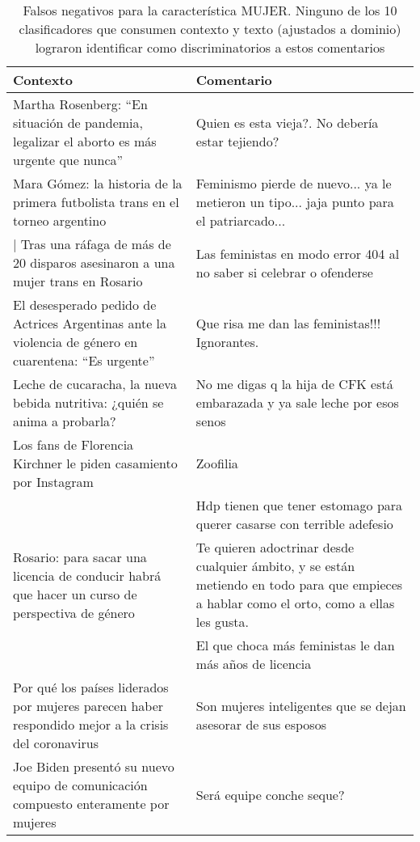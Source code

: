 \begin{table}[t]
    \centering
    \small
    \begin{tabularx}{\textwidth}{X X}
        Contexto & Comentario \\
        \hline
        Martha Rosenberg: ``En situación de pandemia, legalizar el aborto es más urgente que nunca'' & Quien es esta vieja?. No debería estar tejiendo? \\
        \hline
        Mara Gómez: la historia de la primera futbolista trans en el torneo argentino  &  Feminismo pierde de nuevo... ya le metieron un tipo... jaja punto para el patriarcado...	 \\
        \hline|
        Tras una ráfaga de más de 20 disparos asesinaron a una mujer trans en Rosario & Las feministas en modo error 404 al no saber si celebrar o ofenderse  \\
        \hline
         El desesperado pedido de Actrices Argentinas ante la violencia de género en cuarentena: ``Es urgente'' & Que risa me dan las feministas!!! Ignorantes.	 \\
        \hline
        Leche de cucaracha, la nueva bebida nutritiva: ¿quién se anima a probarla? & No me digas q la hija de CFK está embarazada y ya sale leche por esos senos	 \\
        \hline
        Los fans de Florencia Kirchner le piden casamiento por Instagram & Zoofilia \\
                                & Hdp tienen que tener estomago para querer casarse con terrible adefesio \\
        \hline
         Rosario: para sacar una licencia de conducir habrá que hacer un curso de perspectiva de género & Te quieren adoctrinar desde cualquier ámbito, y se están metiendo en todo para que empieces a hablar como el orto, como a ellas les gusta.	\\
            & El que choca más feministas le dan más años de licencia	\\
        \hline
        Por qué los países liderados por mujeres parecen haber respondido mejor a la crisis del coronavirus & Son mujeres inteligentes que se dejan asesorar de sus esposos \\
         Joe Biden presentó su nuevo equipo de comunicación compuesto enteramente por mujeres & Será equipe conche seque?	\\
         \hline
    \end{tabularx}
    \caption{Falsos negativos para la característica MUJER. Ninguno de los 10 clasificadores que consumen contexto y texto (ajustados a dominio) lograron identificar como discriminatorios a estos comentarios }
    \label{tab:women_error_analysis}
\end{table}





